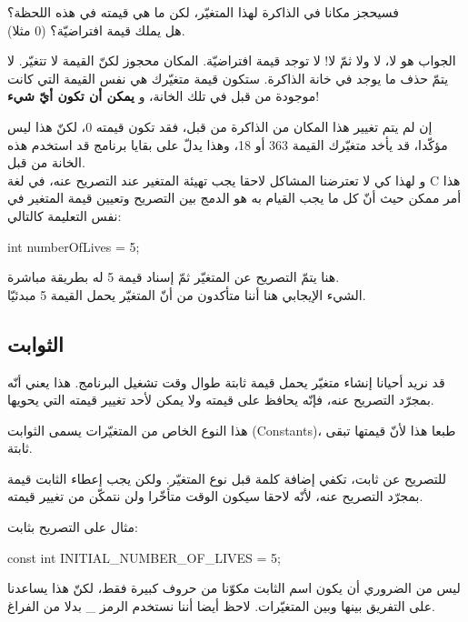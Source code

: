 فسيحجز مكانا في الذاكرة لهذا المتغيّر، لكن ما هي قيمته في هذه اللحظة؟\\
هل يملك قيمة افتراضيّة؟ (0 مثلا).

الجواب هو لا، لا ولا ثمّ لا! لا توجد قيمة افتراضيّة. المكان محجوز لكنّ القيمة لا تتغيّر. لا يتمّ حذف ما يوجد في خانة الذاكرة. ستكون قيمة متغيّرك هي نفس القيمة التي كانت موجودة من قبل في تلك الخانة، و
\textbf{يمكن أن تكون أيّ شيء}!

إن لم يتم تغيير هذا المكان من الذاكرة من قبل، فقد تكون قيمته 0، لكنّ هذا ليس مؤكّدا، قد يأخد متغيّرك القيمة 363 أو 18، وهذا يدلّ على بقايا برنامج قد استخدم هذه الخانة من قبل.\\
و لهذا كي لا تعترضنا المشاكل لاحقا يجب تهيئة المتغير عند التصريح عنه، في لغة
\textenglish{C}
هذا أمر ممكن حيث أنّ كل ما يجب القيام به هو الدمج بين التصريح وتعيين قيمة المتغير في نفس التعليمة كالتالي:

\begin{Csource}
int numberOfLives = 5;
\end{Csource}

هنا يتمّ  التصريح عن المتغيّر ثمّ إسناد قيمة 5 له بطريقة مباشرة.\\
الشيء الإيجابي هنا أننا متأكدون من أنّ المتغيّر يحمل القيمة 5 مبدئيّا.

\subsection{الثوابت}

قد نريد أحيانا إنشاء متغيّر يحمل قيمة ثابتة طوال وقت تشغيل البرنامج. هذا يعني أنّه بمجرّد التصريح عنه، فإنّه يحافظ على قيمته ولا يمكن لأحد تغيير قيمته التي يحويها.

هذا النوع الخاص من المتغيّرات يسمى الثوابت (\textenglish{Constants})، طبعا هذا لأنّ قيمتها تبقى ثابتة.

للتصريح عن ثابت، تكفي إضافة كلمة
قبل نوع المتغيّر. ولكن يجب إعطاء الثابت قيمة بمجرّد التصريح عنه، لأنّه لاحقا سيكون الوقت متأخّرا ولن نتمكّن من تغيير قيمته.

مثال على التصريح بثابت:

\begin{Csource}
const int INITIAL_NUMBER_OF_LIVES = 5;
\end{Csource}

\begin{information}
  ليس من الضروري أن يكون اسم الثابت مكوّنا من حروف كبيرة فقط، لكنّ هذا يساعدنا على التفريق بينها وبين المتغيّرات. لاحظ أيضا أننا نستخدم الرمز
\_
 بدلا من الفراغ.
\end{information}

